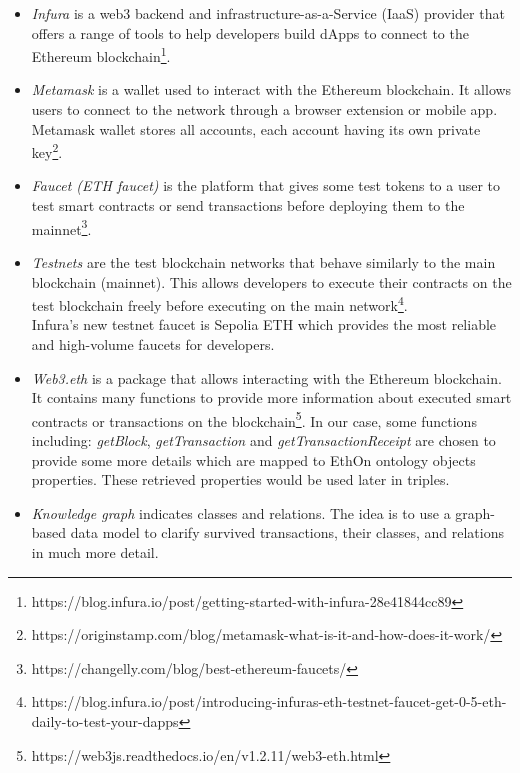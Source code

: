 \begin{itemize}
\item \textit{Infura} is a web3 backend and infrastructure-as-a-Service (IaaS) provider that offers a range of tools to help developers build dApps to connect to the Ethereum blockchain\footnote{https://blog.infura.io/post/getting-started-with-infura-28e41844cc89}.\\
\item \textit{Metamask} is a wallet used to interact with the Ethereum blockchain. It allows users to connect to the network through a browser extension or mobile app. Metamask wallet stores all accounts, each account having its own private key\footnote{https://originstamp.com/blog/metamask-what-is-it-and-how-does-it-work/}.\\
\item \textit{Faucet (ETH faucet)} is the platform that gives some test tokens to a user to test smart contracts or send transactions before deploying them to the mainnet\footnote{https://changelly.com/blog/best-ethereum-faucets/}. \\
\item \textit{Testnets} are the test blockchain networks that behave similarly to the main blockchain (mainnet). This allows developers to execute their contracts on the test blockchain freely before executing on the main network\footnote{https://blog.infura.io/post/introducing-infuras-eth-testnet-faucet-get-0-5-eth-daily-to-test-your-dapps}. \\
Infura's new testnet faucet is Sepolia ETH which provides the most reliable and high-volume faucets for developers.\\
\item \textit{Web3.eth} is a package that allows interacting with the Ethereum blockchain. It contains many functions to provide more information about executed smart contracts or transactions on the blockchain\footnote{https://web3js.readthedocs.io/en/v1.2.11/web3-eth.html}. 
In our case, some functions including: \textit{getBlock}, \textit{getTransaction} and \textit{getTransactionReceipt} are chosen to provide some more details which are mapped to EthOn ontology objects properties. These retrieved properties would be used later in triples.\\
\item \textit{Knowledge graph} indicates classes and relations.
The idea is to use a graph-based data model to clarify survived transactions, their classes, and relations in much more detail.
\begin{center}
	

\end{center}
\end{itemize}
